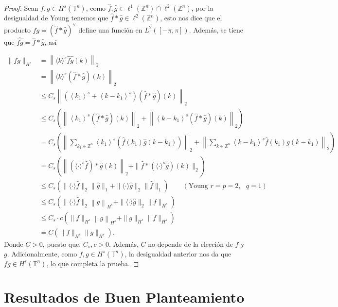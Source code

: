 \documentclass[12pt]{article}
\newcommand\Z{\ensuremath{\mathbb{Z}}}
\newcommand\T{\mathbb{T}}
\renewcommand{\hat}{\widehat}
\begin{document}
\begin{proof}
Sean $f,g\in H^s(\T^n)$, como $\widehat{f}, \widehat{g} \in \ell^1(\mathbb{Z}^n) \cap \ell^2(\mathbb{Z}^n)$, por la desigualdad de Young tenemos que $\widehat{f} * \widehat{g} \in \ell^2(\mathbb{Z}^n)$, esto nos dice que el producto $f g=(\widehat{f} * \widehat{g})^{\vee}$ define una función en $L^2([-\pi, \pi])$. Además, se tiene que $\widehat{f g}=\widehat{f} * \widehat{g}$, así

$$
\begin{aligned}
\|f g\|_{H^s}& =\left\|\langle k\rangle^s \hat{f g}(k)\right\|_2\\
&=\left\|\langle k\rangle^s(\hat{f} * \hat{g})(k)\right\|_2 \\
& \leq C_s\left\|\left(\left\langle k_1\right\rangle^s+\left\langle k-k_1\right\rangle^s\right)(\hat{f}*\hat{g})(k)\right\|_2 \\
& \leq C_s\left.\left(\left\|\left\langle k_1\right\rangle^s(\hat{f} * \hat{g})(k)\right\|_2+\left\|\left\langle k-k_1\right\rangle^s(\hat{f} * \hat{g})(k)\right\|_2\right)\right. \\
& =C_s\left(\left\|\sum_{k_1 \in \Z^n}\left\langle k_1\right\rangle^s\left(\hat{f}\left(k_1\right) \hat{g}\left(k-k_1\right)\right)\right\|_2+\left\|\sum_{k \in \Z^n}\left\langle k-k_1\right\rangle^s \hat{f}\left(k_1\right) g\left(k-k_1\right)\right\|_2\right) \\
& =C_s\left(\left\|\left(\langle\cdot\rangle^s \hat{f}\right) * \hat{g}(k)\right\|_2+\| \hat{f} *\left(\langle\cdot\rangle^s \hat{g}\right)(k) \|_2\right)\\
&\leq C_s\left(\|\langle\cdot\rangle \hat{f}\|_2\|\hat{g}\|_1+\|\langle\cdot\rangle \hat{g}\|_2\|\hat{f}\|_1\right) \quad \quad (\text{Young }r=p=2,\text{ } q=1) \\
& \leq C_s\left(\|\langle\cdot\rangle \hat{f}\|_2\left\|g\right\|_{H^s}+\|\langle\cdot\rangle \hat{g}\|_2\|f\|_{H^s}\right) \\
& \leq C_s\cdot c\left(\|f\|_{H^s}\left\|g\right\|_{H^s}+\|g\|_{H^s}\|f\|_{H^s}\right) \\
& =C\left(\|f\|_{H^s}\|g\|_{H^s}\right).
\end{aligned}
$$
Donde $C > 0$, puesto que, $C_s, c > 0$. Además, $C$ no depende de la elección de $f$ y $g$. Adicionalmente, como $f, g \in H^s(\mathbb{T}^n)$, la desigualdad anterior nos da que $fg \in H^s(\mathbb{T}^n)$, lo que completa la prueba.


\end{proof}


\section{Resultados de Buen Planteamiento}

\newpage



\nocite{*}
\end{document}
